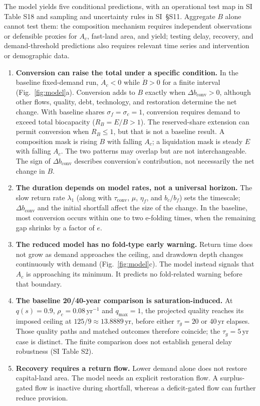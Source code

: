 \documentclass[preprint,12pt,authoryear]{elsarticle}
\newcommand{\dconv}{\Delta b_{\mathrm{conv}}}
\newcommand{\tconv}{\tau_{\mathrm{conv}}}
\begin{document}
The model yields five conditional predictions, with an operational test map in SI Table S18 and sampling and uncertainty rules in SI~\S S11. Aggregate $B$ alone cannot test them: the composition mechanism requires independent observations or defensible proxies for $A_c$, fast-land area, and yield; testing delay, recovery, and demand-threshold predictions also requires relevant time series and intervention or demographic data.
\begin{enumerate}[label=P\arabic*.,leftmargin=2.2em]
\item \textbf{Conversion can raise the total under a specific condition.} In the baseline fixed-demand run, $\dot A_c<0$ while $\dot B>0$ for a finite interval (Fig.~\ref{fig:model}a). Conversion adds to $B$ exactly when $\dconv>0$, although other flows, quality, debt, technology, and restoration determine the net change. With baseline shares $\sigma_f=\sigma_c=1$, conversion requires demand to exceed total biocapacity ($R_B=E/B>1$). The reserved-share extension can permit conversion when $R_B\le1$, but that is not a baseline result. A composition mask is rising $B$ with falling $A_c$; a liquidation mask is steady $E$ with falling $A_c$. The two patterns may overlap but are not interchangeable. The sign of $\dconv$ describes conversion's contribution, not necessarily the net change in $B$.
\item \textbf{The duration depends on model rates, not a universal horizon.} The slow return rate $\lambda_1$ (along with $\tconv$, $\mu$, $\eta_f$, and $b_c/b_f$) sets the timescale; $\dconv$ and the initial shortfall affect the size of the change. In the baseline, most conversion occurs within one to two e-folding times, when the remaining gap shrinks by a factor of $e$.
\item \textbf{The reduced model has no fold-type early warning.} Return time does not grow as demand approaches the ceiling, and drawdown depth changes continuously with demand (Fig.~\ref{fig:model}c). The model instead signals that $A_c$ is approaching its minimum. It predicts no fold-related warning before that boundary.
\item \textbf{The baseline 20/40-year comparison is saturation-induced.} At $q(s)=0.9$, $\rho_c=0.08$\,yr$^{-1}$ and $q_{\max}=1$, the projected quality reaches its imposed ceiling at $125/9\approx13.8889$\,yr, before either $\tau_g=20$ or $40$\,yr elapses. Those quality paths and matched outcomes therefore coincide; the $\tau_g=5$\,yr case is distinct. The finite comparison does not establish general delay robustness (SI Table S2).
\item \textbf{Recovery requires a return flow.} Lower demand alone does not restore capital-land area. The model needs an explicit restoration flow. A surplus-gated flow is inactive during shortfall, whereas a deficit-gated flow can further reduce provision.
\end{enumerate}
\end{document}
